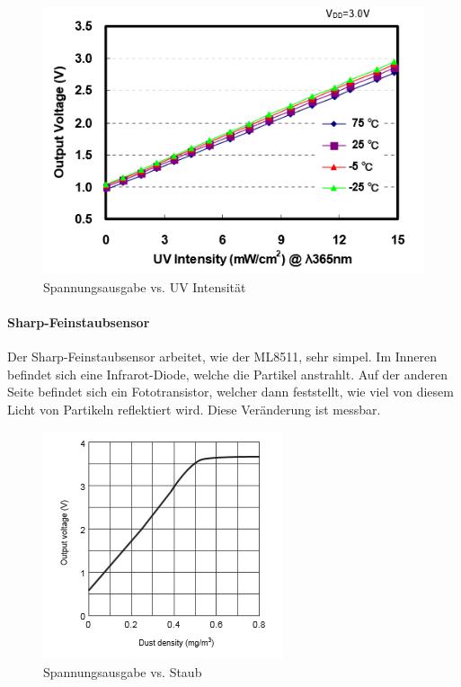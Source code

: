 \begin{figure}[h]
	\centering
	\includegraphics[scale=0.4]{2_Beschreibung_des_CANSAT/graph_photodiode_response.png}
	\caption{Spannungsausgabe vs. UV Intensität}
	\label{graph photodiode}
\end{figure}


\paragraph{Sharp-Feinstaubsensor}
Der Sharp-Feinstaubsensor arbeitet, wie der ML8511, sehr simpel. Im Inneren befindet sich eine Infrarot-Diode, welche die Partikel anstrahlt. Auf der anderen Seite befindet sich ein Fototransistor, welcher dann feststellt, wie viel von diesem Licht von Partikeln reflektiert wird. Diese Veränderung ist messbar.

\begin{figure}[h]
	\centering
	\includegraphics[scale=0.5]{2_Beschreibung_des_CANSAT/graph_photodiode_sharp.png}
	\caption{Spannungsausgabe vs. Staub}
	\label{graph photodiode}
\end{figure}

